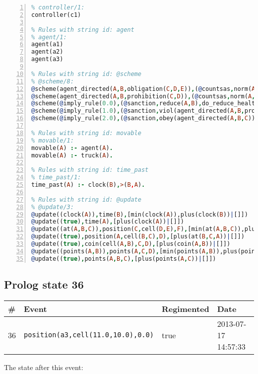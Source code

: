 \documentclass[11pt]{article}\usepackage[utf8]{inputenc}\usepackage{geometry}
\begin{document}
\begin{lstlisting}[language=Prolog, numbers=left]
% Rules with string id: controller
% controller/1:
controller(c1)

% Rules with string id: agent
% agent/1:
agent(a1)
agent(a2)
agent(a3)

% Rules with string id: @scheme
% @scheme/8:
@scheme(agent_directed(A,B,obligation(C,D,E)),(@countsas,norm(A,B,F,obligation(C,D,E)),F),false,(listTrue(C)),(time_past(D)),false,[plus(viol(agent_directed(A,B,obligation(C,D,E))))|[]],[plus(obey(agent_directed(A,B,obligation(C,D,E))))|[]])
@scheme(agent_directed(A,B,prohibition(C,D)),(@countsas,norm(A,B,E,prohibition(C,D)),E),(listTrue(C)),false,(false),false,[plus(viol(agent_directed(A,B,prohibition(C,D))))|[]],[plus(obey(agent_directed(A,B,prohibition(C,D))))|[]])
@scheme(@imply_rule(0.0),(@sanction,reduce(A,B),do_reduce_health(A,B),notifyAgent(A,changed(status))),true,false,false,false,[min(reduce(A,B))|[]],[])
@scheme(@imply_rule(1.0),(@sanction,viol(agent_directed(A,B,prohibition(C,D))),do_sanction(D)),true,false,false,false,[min(viol(agent_directed(A,B,prohibition(C,D))))|[]],[])
@scheme(@imply_rule(2.0),(@sanction,obey(agent_directed(A,B,C))),true,false,false,false,[min(obey(agent_directed(A,B,C)))|[]],[])

% Rules with string id: movable
% movable/1:
movable(A) :- agent(A).
movable(A) :- truck(A).

% Rules with string id: time_past
% time_past/1:
time_past(A) :- clock(B),>(B,A).

% Rules with string id: @update
% @update/3:
@update((clock(A)),time(B),[min(clock(A)),plus(clock(B))|[]])
@update((true),time(A),[plus(clock(A))|[]])
@update((at(A,B,C)),position(C,cell(D,E),F),[min(at(A,B,C)),plus(at(D,E,C))|[]])
@update((true),position(A,cell(B,C),D),[plus(at(B,C,A))|[]])
@update((true),coin(cell(A,B),C,D),[plus(coin(A,B))|[]])
@update((points(A,B)),points(A,C,D),[min(points(A,B)),plus(points(A,D))|[]])
@update((true),points(A,B,C),[plus(points(A,C))|[]])

\end{lstlisting}
\clearpage 
\subsection{Prolog state 36}
\begin{table}[ht]
\centering 
\begin{tabular}{l l l l} 
\textbf{\#} & \textbf{Event} & \textbf{Regimented} & \textbf{Date} \\ [0.5ex] 
\hline
36&\texttt{position(a3,cell(11.0,10.0),0.0)}&true&2013-07-17 14:57:33\\ [1ex] \hline\end{tabular}
\end{table}
The state after this event:
\end{document}

